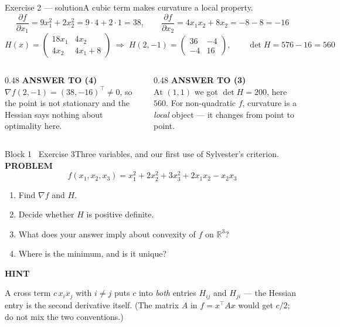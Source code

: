\documentclass[aspectratio=169,11pt]{beamer}
\newcommand{\kicker}[1]{{\color{hseaccent}\scriptsize\bfseries\MakeUppercase{#1}}}
\newcommand{\takeaway}[2]{%
  \par\smallskip\noindent
  \colorbox{hselight}{\parbox{\dimexpr\textwidth-2\fboxsep}{%
    \kicker{#1}\par\vspace{0.12em}\footnotesize #2}}\par}
\begin{document}
\begin{frame}{Exercise 2 --- solution}{A cubic term makes curvature a local property.}
  \vspace{0.2em}
  \[ \frac{\partial f}{\partial x_1}=9x_1^{2}+2x_2^{2}=9\cdot4+2\cdot1=38,\qquad
    \frac{\partial f}{\partial x_2}=4x_1x_2+8x_2=-8-8=-16 \]
  \[ H(x)=\begin{pmatrix}18x_1 & 4x_2\\ 4x_2 & 4x_1+8\end{pmatrix}
    \;\Rightarrow\;
    H(2,-1)=\begin{pmatrix}36&-4\\-4&16\end{pmatrix},\qquad \det H = 576-16=560 \]
  \vspace{0.2em}
  \begin{columns}[T,onlytextwidth]
    \begin{column}{0.48\textwidth}
      \kicker{answer to (4)}\\[0.2em]
      {\small $\nabla f(2,-1)=(38,-16)^{\top}\neq 0$, so the point is not stationary and the Hessian
        says nothing about optimality here.}
    \end{column}
    \begin{column}{0.48\textwidth}
      \kicker{answer to (3)}\\[0.2em]
      {\small At $(1,1)$ we got $\det H=200$, here $560$. For non-quadratic $f$, curvature is a
        \emph{local} object --- it changes from point to point.}
    \end{column}
  \end{columns}
\end{frame}

\begin{frame}{Block 1 \textperiodcentered\ Exercise 3}{Three variables, and our first use of Sylvester's criterion.}
  \vspace{0.6em}
  \kicker{problem}
  \[ f(x_1,x_2,x_3)=x_1^{2}+2x_2^{2}+3x_3^{2}+2x_1x_2-x_2x_3 \]
  \vspace{-0.5em}
  \begin{enumerate}\small
    \item Find $\nabla f$ and $H$.
    \item Decide whether $H$ is positive definite.
    \item What does your answer imply about convexity of $f$ on $\mathbb{R}^3$?
    \item Where is the minimum, and is it unique?
  \end{enumerate}
  \vspace{0.5em}
  \takeaway{hint}{A cross term $c\,x_ix_j$ with $i\neq j$ puts $c$ into \emph{both} entries $H_{ij}$
    and $H_{ji}$ --- the Hessian entry is the second derivative itself. (The matrix $A$ in $f=x^{\top}\!Ax$
    would get $c/2$; do not mix the two conventions.)}
\end{frame}
\end{document}
